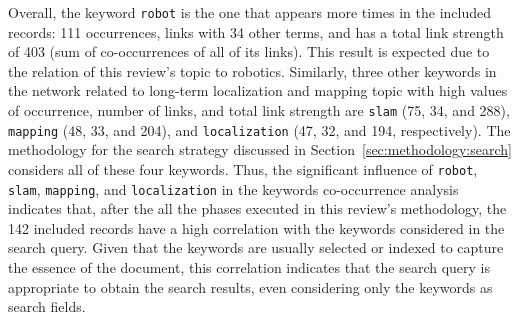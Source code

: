 Overall, the keyword \texttt{robot} is the one that appears more times in the included records: 111 occurrences, links with 34 other terms, and has a total link strength of 403 (sum of co-occurrences of all of its links). This result is expected due to the relation of this review's topic to robotics.
Similarly, three other keywords in the network related to long-term localization and mapping topic with high values of occurrence, number of links, and total link strength are \texttt{slam} (75, 34, and 288), \texttt{mapping} (48, 33, and 204), and \texttt{localization} (47, 32, and 194, respectively). The methodology for the search strategy discussed in Section~\ref{sec:methodology:search} considers all of these four keywords. Thus, the significant influence of \texttt{robot}, \texttt{slam}, \texttt{mapping}, and \texttt{localization} in the keywords co-occurrence analysis indicates that, after the all the phases executed in this review's methodology, the 142 included records have a high correlation with the keywords considered in the search query. Given that the keywords are usually selected or indexed to capture the essence of the document, this correlation indicates that the search query is appropriate to obtain the search results, even considering only the keywords as search fields.

